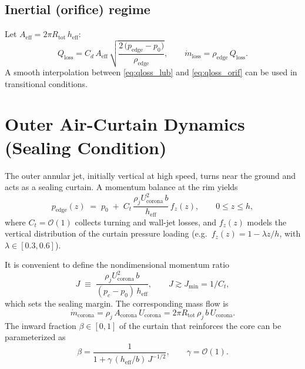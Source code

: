 \documentclass[11pt,a4paper]{article}
\begin{document}
\subsection*{Inertial (orifice) regime}
Let $A_{\mathrm{eff}}=2\pi R_{\text{tot}}\,h_{\mathrm{eff}}$:
\begin{equation}
  Q_{\mathrm{loss}}
  = C_d\,A_{\mathrm{eff}}\,\sqrt{\frac{2\,\big(p_\mathrm{edge}-p_0\big)}{\rho_\mathrm{edge}}},
  \qquad \dot m_{\mathrm{loss}}=\rho_\mathrm{edge}\,Q_{\mathrm{loss}}.
  \label{eq:qloss_orif}
\end{equation}
A smooth interpolation between \eqref{eq:qloss_lub} and \eqref{eq:qloss_orif} can be used in transitional conditions.

\section{Outer Air-Curtain Dynamics (Sealing Condition)}
The outer annular jet, initially vertical at high speed, turns near the ground and acts as a sealing curtain. A momentum balance at the rim yields
\begin{equation}
  p_\mathrm{edge}(z) \;=\; p_0 \;+\;
  C_t\,\frac{\rho_j U_{\mathrm{corona}}^{2}\,b}{h_{\mathrm{eff}}}\,f_z(z),
  \qquad 0\le z\le h,
  \label{eq:curtain_force}
\end{equation}
where $C_t=\mathcal{O}(1)$ collects turning and wall-jet losses, and $f_z(z)$ models the vertical distribution of the curtain pressure loading
(e.g.\ $f_z(z)=1-\lambda z/h$, with $\lambda\in[0.3,0.6]$).

It is convenient to define the nondimensional momentum ratio
\begin{equation}
  J \;\equiv\; \frac{\rho_j U_{\mathrm{corona}}^{2}\,b}{(p_c-p_0)\,h_{\mathrm{eff}}},
  \qquad J\gtrsim J_{\min}=1/C_t,
  \label{eq:J}
\end{equation}
which sets the sealing margin. The corresponding mass flow is
\begin{equation}
  \dot m_{\mathrm{corona}} = \rho_j\,A_{\mathrm{corona}}\,U_{\mathrm{corona}}
  = 2\pi R_{\text{tot}}\,\rho_j\,b\,U_{\mathrm{corona}}.
  \label{eq:mcorona}
\end{equation}
The inward fraction $\beta\in[0,1]$ of the curtain that reinforces the core can be parameterized as
\begin{equation}
  \beta = \frac{1}{1+\gamma\,(h_{\mathrm{eff}}/b)\,J^{-1/2}},\qquad \gamma=\mathcal{O}(1).
  \label{eq:beta}
\end{equation}
\end{document}
